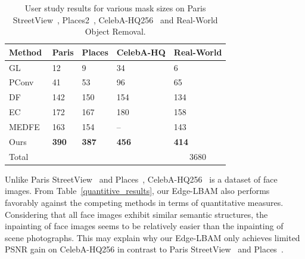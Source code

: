 \documentclass[10pt,journal,compsoc]{IEEEtran}
\begin{document}
\begin{table}[!htbp]
	\scriptsize
	\begin{center}
		\caption{User study results for various mask sizes on Paris StreetView~\cite{doersch2015makes},
			Places2~\cite{zhou2017places}, CelebA-HQ256~\cite{karras2017progressive} and Real-World Object Removal.}
		\begin{tabular}{p{1.0cm} p{1.3cm}<{\centering} p{1.3cm}<{\centering} p{1.3cm}<{\centering} p{1.3cm}<{\centering}}%
			\toprule
			
			Method & Paris & Places & CelebA-HQ  & Real-World \\
			\midrule
			GL~\cite{IizukaGL}  & 12 & 9 & 34 & 6 \\
			PConv~\cite{partialconv2017} & 41 & 53& 96 & 65      \\
			DF~\cite{yu2018free}  & 142 & 150 & 154 & 134\\
			EC~\cite{nazeri2019edgeconnect}  & 172 &167  & 180 & 158\\
			MEDFE~\cite{liu2020rethinking} & 163 &154 & --& 143 \\
			Ours& \textbf{390} & \textbf{387} & \textbf{456}  & \textbf{414}\\
			\midrule
			Total&~&~&~&\multicolumn{1}{c}{3680}\\
			\bottomrule
		\end{tabular}
		\label{user_study}
	\end{center}
\end{table}
Unlike Paris StreetView~\cite{doersch2015makes} and Places~\cite{zhou2017places}, CelebA-HQ256~\cite{karras2017progressive} is a dataset of face images.
%
From Table~\ref{quantitive_results}, our Edge-LBAM also performs favorably against the competing methods in terms of quantitative measures.
%
Considering that all face images exhibit similar semantic structures, the inpainting of face images seems to be relatively easier than the inpainting of scene photographs.
%
This may explain why our Edge-LBAM only achieves limited PSNR gain on CelebA-HQ256 in contrast to Paris StreetView~\cite{doersch2015makes} and Places~\cite{zhou2017places}.
\end{document}
